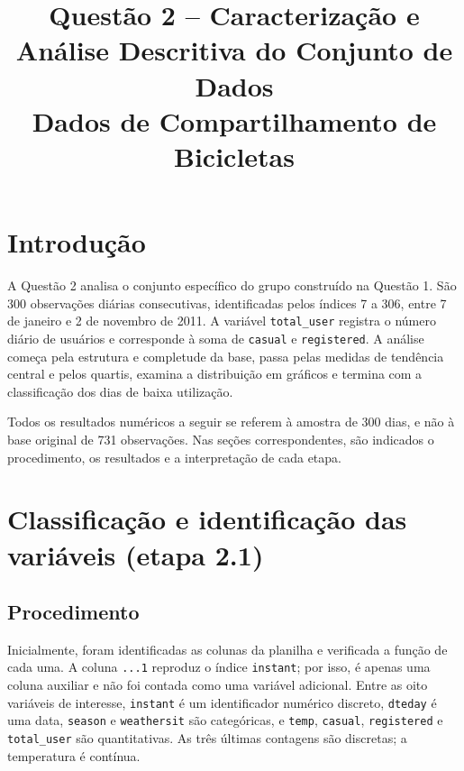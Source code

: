 \documentclass[12pt,a4paper]{article}
\title{Questão 2 -- Caracterização e Análise Descritiva do Conjunto de Dados\\
  \large Dados de Compartilhamento de Bicicletas}
\author{}
\date{}
\begin{document}
\maketitle

\section{Introdução}

A Questão 2 analisa o conjunto específico do grupo construído na Questão 1.
São 300 observações diárias consecutivas, identificadas pelos índices 7 a 306,
entre 7 de janeiro e 2 de novembro de 2011. A variável
\texttt{total\_user} registra o número diário de usuários e corresponde à soma
de \texttt{casual} e \texttt{registered}. A análise começa pela estrutura e
completude da base, passa pelas medidas de tendência central e pelos quartis,
examina a distribuição em gráficos e termina com a classificação dos dias de
baixa utilização.

Todos os resultados numéricos a seguir se referem à amostra de 300 dias, e não
à base original de 731 observações. Nas seções correspondentes, são indicados
o procedimento, os resultados e a interpretação de cada etapa.

\section{Classificação e identificação das variáveis (etapa 2.1)}

\subsection{Procedimento}

Inicialmente, foram identificadas as colunas da planilha e verificada a
função de cada uma. A coluna \texttt{...1} reproduz o índice
\texttt{instant}; por isso, é apenas uma coluna auxiliar e não foi contada
como uma variável adicional. Entre as oito variáveis de interesse,
\texttt{instant} é um identificador numérico discreto, \texttt{dteday} é uma
data, \texttt{season} e \texttt{weathersit} são categóricas, e
\texttt{temp}, \texttt{casual}, \texttt{registered} e
\texttt{total\_user} são quantitativas. As três últimas contagens são
discretas; a temperatura é contínua.
\end{document}
